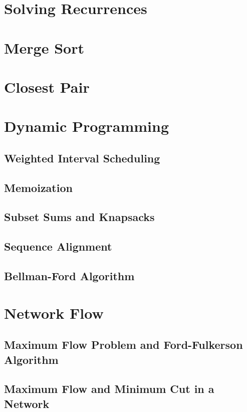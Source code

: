 \documentclass{article}
\begin{document}











\section{Solving Recurrences}
\section{Merge Sort}
\section{Closest Pair}
\section{Dynamic Programming}
\subsection{Weighted Interval Scheduling}
\subsection{Memoization}
\subsection{Subset Sums and Knapsacks}
\subsection{Sequence Alignment}
\subsection{Bellman-Ford Algorithm}
\section{Network Flow}
\subsection{Maximum Flow Problem and Ford-Fulkerson Algorithm}
\subsection{Maximum Flow and Minimum Cut in a Network}
\end{document}

